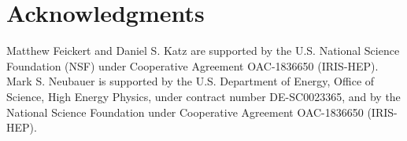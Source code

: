 \section*{Acknowledgments}\label{sec:acknowledgments}
Matthew Feickert and Daniel S. Katz are supported by the U.S. National Science Foundation (NSF) under Cooperative Agreement OAC-1836650 (IRIS-HEP).
Mark S. Neubauer is supported by the U.S. Department of Energy, Office of Science, High Energy Physics, under contract number DE-SC0023365, and by the National Science Foundation under Cooperative Agreement OAC-1836650 (IRIS-HEP).
